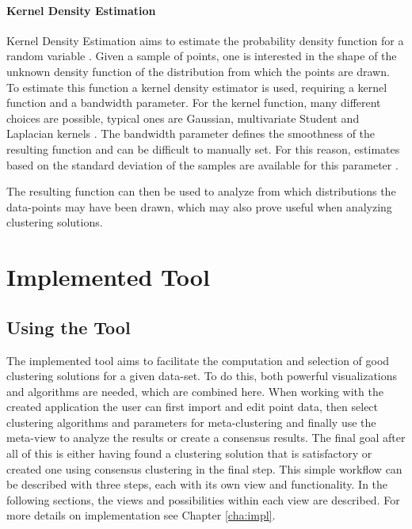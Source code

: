 \documentclass[
	a4paper,
	english,
	twoside,
	openright,               
	11pt                            
	]{report}
\begin{document}

\subsection{Kernel Density Estimation}
Kernel Density Estimation aims to estimate the probability density function for a random variable \cite{parzen1962estimation}. Given a sample of points, one is interested in the shape of the unknown density function of the distribution from which the points are drawn. To estimate this function a kernel density estimator is used, requiring a kernel function and a bandwidth parameter. For the kernel function, many different choices are possible, typical ones are Gaussian, multivariate Student and Laplacian kernels \cite{kim2011robust}. The bandwidth parameter defines the smoothness of the resulting function and can be difficult to manually set. For this reason, estimates based on the standard deviation of the samples are available for this parameter \cite{rulethumbdens}.

The resulting function can then be used to analyze from which distributions the data-points may have been drawn, which may also prove useful when analyzing clustering solutions.

\part{Implemented Tool}
\chapter{Using the Tool}\label{cha:Tool}
The implemented tool aims to facilitate the computation and selection of good clustering solutions for a given data-set. To do this, both powerful visualizations and algorithms are needed, which are combined here. When working with the created application the user can first import and edit point data, then select clustering algorithms and parameters for meta-clustering and finally use the meta-view to analyze the results or create a consensus results. The final goal after all of this is either having found a clustering solution that is satisfactory or created one using consensus clustering in the final step. This simple workflow can be described with three steps, each with its own view and functionality. In the following sections, the views and possibilities within each view are described. For more details on implementation see Chapter \ref{cha:impl}.
\end{document}
